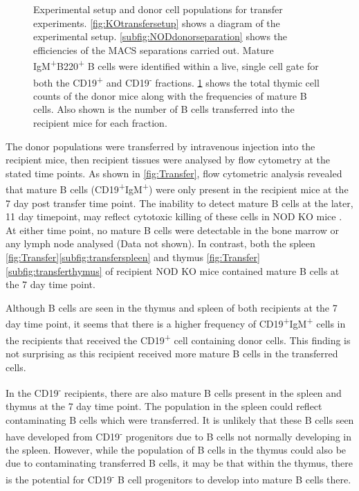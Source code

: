 \begin{figure}
\begin{subfigure}{0.5\textwidth}
	\label{subfig:WTdonortable}
	\end{subfigure}
\caption[Experimental setup and donor cell populations for transfer experiments]{Experimental setup and donor cell populations for transfer experiments.
\ref{fig:KOtransfersetup} shows a diagram of the experimental setup.
\ref{subfig:NODdonorseparation} shows the efficiencies of the MACS separations carried out. Mature IgM\textsuperscript{+}B220\textsuperscript{+} B cells were identified within a live, single cell gate for both the CD19\textsuperscript{+} and CD19\textsuperscript{-} fractions.
\ref{subfig:WTdonortable} shows the total thymic cell counts of the donor mice along with the frequencies of mature B cells. Also shown is the number of B cells transferred into the recipient mice for each fraction.}
\label{fig:Transfersetup}
\end{figure}
	
	
The donor populations were transferred by intravenous injection into the recipient mice, then recipient tissues were analysed by flow cytometry at the stated time points.
As shown in \cref{fig:Transfer}, flow cytometric analysis revealed that mature B cells (CD19\textsuperscript{+}IgM\textsuperscript{+}) were only present in the recipient mice at the 7 day post transfer time point.
The inability to detect mature B cells at the later, 11 day timepoint, may reflect cytotoxic killing of these cells in NOD KO mice \citep{Serreze1998}.
At either time point, no mature B cells were detectable in the bone marrow or any lymph node analysed (Data not shown).
In contrast, both the spleen \cref{fig:Transfer}\ref{subfig:transferspleen} and thymus \cref{fig:Transfer}\ref{subfig:transferthymus} of recipient NOD KO mice contained mature B cells at the 7 day time point.


Although B cells are seen in the thymus and spleen of both recipients at the 7 day time point, it seems that there is a higher frequency of CD19\textsuperscript{+}IgM\textsuperscript{+} cells in the recipients that received the CD19\textsuperscript{+} cell containing donor cells.
This finding is not surprising as this recipient received more mature B cells in the transferred cells.

In the CD19\textsuperscript{-} recipients, there are also mature B cells present in the spleen and thymus at the 7 day time point.
The population in the spleen could reflect contaminating B cells which were transferred. 
It is unlikely that these B cells seen have developed from CD19\textsuperscript{-} progenitors due to B cells not normally developing in the spleen.
However, while the population of B cells in the thymus could also be due to contaminating transferred B cells, it may be that within the thymus, there is the potential for CD19\textsuperscript{-} B cell progenitors to develop into mature B cells there.


